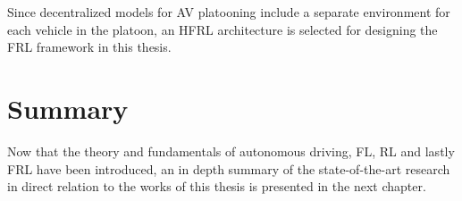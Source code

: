 Since decentralized models for AV platooning include a separate environment for each
vehicle in the platoon, an HFRL architecture is selected for designing the FRL framework in this thesis.

\section{Summary}
Now that the theory and fundamentals of autonomous driving, FL, RL and lastly FRL
have been introduced, an in depth summary of the state-of-the-art research in
direct relation to the works of this thesis is presented in the next chapter.
